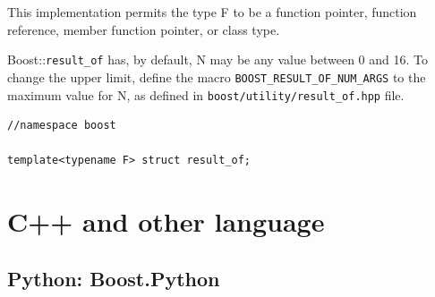 This implementation permits the type F to be a function pointer, function
reference, member function pointer, or class type.

Boost::\verb!result_of! has, by default, N may be any value between 0 and 16.
To change the upper limit, define the macro \verb!BOOST_RESULT_OF_NUM_ARGS! to the maximum value for N, as defined in 
\verb!boost/utility/result_of.hpp! file.



\begin{verbatim}
//namespace boost

template<typename F> struct result_of;
\end{verbatim}

\section{C++ and other language}

\subsection{Python: Boost.Python}

